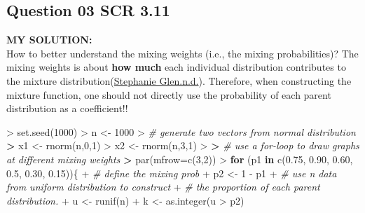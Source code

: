 \documentclass[
]{article}
\newenvironment{Shaded}{\begin{snugshade}}{\end{snugshade}}
\newcommand{\AttributeTok}[1]{\textcolor[rgb]{0.77,0.63,0.00}{#1}}
\newcommand{\CommentTok}[1]{\textcolor[rgb]{0.56,0.35,0.01}{\textit{#1}}}
\newcommand{\ControlFlowTok}[1]{\textcolor[rgb]{0.13,0.29,0.53}{\textbf{#1}}}
\newcommand{\DecValTok}[1]{\textcolor[rgb]{0.00,0.00,0.81}{#1}}
\newcommand{\ErrorTok}[1]{\textcolor[rgb]{0.64,0.00,0.00}{\textbf{#1}}}
\newcommand{\FloatTok}[1]{\textcolor[rgb]{0.00,0.00,0.81}{#1}}
\newcommand{\FunctionTok}[1]{\textcolor[rgb]{0.00,0.00,0.00}{#1}}
\newcommand{\NormalTok}[1]{#1}
\newcommand{\OtherTok}[1]{\textcolor[rgb]{0.56,0.35,0.01}{#1}}
\newcommand{\SpecialCharTok}[1]{\textcolor[rgb]{0.00,0.00,0.00}{#1}}
\begin{document}
\hypertarget{question-03-scr-3.11}{%
\subsection{Question 03 SCR 3.11}\label{question-03-scr-3.11}}

\textbf{MY SOLUTION:}\\
How to better understand the mixing weights (i.e., the mixing
probabilities)? The mixing weights is about \textbf{how much} each
individual distribution contributes to the mixture
distribution(\href{https://www.statisticshowto.com/mixture-distribution/}{Stephanie
Glen.n.d.}). Therefore, when constructing the mixture function, one
should not directly use the probability of each parent distribution as a
coefficient!!

\begin{Shaded}
\begin{Highlighting}[]
\SpecialCharTok{\textgreater{}} \FunctionTok{set.seed}\NormalTok{(}\DecValTok{1000}\NormalTok{)}
\SpecialCharTok{\textgreater{}}\NormalTok{ n }\OtherTok{\textless{}{-}} \DecValTok{1000}
\SpecialCharTok{\textgreater{}} \CommentTok{\# generate two vectors from normal distribution}
\ErrorTok{\textgreater{}}\NormalTok{ x1 }\OtherTok{\textless{}{-}} \FunctionTok{rnorm}\NormalTok{(n,}\DecValTok{0}\NormalTok{,}\DecValTok{1}\NormalTok{)}
\SpecialCharTok{\textgreater{}}\NormalTok{ x2 }\OtherTok{\textless{}{-}} \FunctionTok{rnorm}\NormalTok{(n,}\DecValTok{3}\NormalTok{,}\DecValTok{1}\NormalTok{)}
\SpecialCharTok{\textgreater{}} 
\ErrorTok{\textgreater{}} \CommentTok{\# use a for{-}loop to draw graphs at different mixing weights}
\ErrorTok{\textgreater{}} \FunctionTok{par}\NormalTok{(}\AttributeTok{mfrow=}\FunctionTok{c}\NormalTok{(}\DecValTok{3}\NormalTok{,}\DecValTok{2}\NormalTok{))}
\SpecialCharTok{\textgreater{}} \ControlFlowTok{for}\NormalTok{ (p1 }\ControlFlowTok{in} \FunctionTok{c}\NormalTok{(}\FloatTok{0.75}\NormalTok{, }\FloatTok{0.90}\NormalTok{, }\FloatTok{0.60}\NormalTok{, }\FloatTok{0.5}\NormalTok{, }\FloatTok{0.30}\NormalTok{, }\FloatTok{0.15}\NormalTok{))\{}
\SpecialCharTok{+}   \CommentTok{\# define the mixing prob}
\SpecialCharTok{+}\NormalTok{   p2 }\OtherTok{\textless{}{-}} \DecValTok{1} \SpecialCharTok{{-}}\NormalTok{ p1}
\SpecialCharTok{+}   \CommentTok{\# use n data from uniform distribution to construct}
\SpecialCharTok{+}   \CommentTok{\# the proportion of each parent distribution.}
\SpecialCharTok{+}\NormalTok{   u }\OtherTok{\textless{}{-}} \FunctionTok{runif}\NormalTok{(n)}
\SpecialCharTok{+}\NormalTok{   k }\OtherTok{\textless{}{-}} \FunctionTok{as.integer}\NormalTok{(u }\SpecialCharTok{\textgreater{}}\NormalTok{ p2)}

\end{Highlighting}
\end{Shaded}
\end{document}
